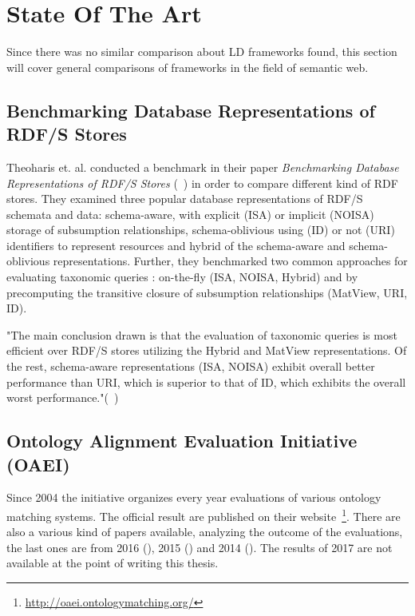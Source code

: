 \chapter{State Of The Art}

Since there was no similar comparison about LD frameworks found, this section will cover general comparisons of frameworks in the field of semantic web.

\section{Benchmarking Database Representations of RDF/S Stores}

Theoharis et. al. conducted a benchmark in their paper \emph{Benchmarking Database Representations of RDF/S Stores} (~\cite{theoharis2005benchmarking}) in order to compare different kind of RDF stores. They examined three popular database representations of RDF/S schemata and data: schema-aware, with explicit (ISA) or implicit (NOISA) storage of subsumption relationships, schema-oblivious using (ID) or not (URI) identifiers to represent resources and hybrid of the schema-aware and schema-oblivious representations. Further, they benchmarked two common approaches for evaluating taxonomic queries : on-the-fly (ISA, NOISA, Hybrid) and by precomputing the transitive closure of subsumption relationships (MatView, URI, ID). 

"The main conclusion drawn is that the evaluation of taxonomic queries is most efficient over RDF/S stores utilizing the Hybrid and MatView representations. Of the rest, schema-aware representations (ISA, NOISA) exhibit overall better performance than URI, which is superior to that of ID, which exhibits the overall worst performance."(~\cite{theoharis2005benchmarking})

\section{Ontology Alignment Evaluation Initiative (OAEI)}

Since 2004 the initiative organizes every year evaluations of various ontology matching systems. The official result are published on their website~\footnote{\url{http://oaei.ontologymatching.org/}}. There are also a various kind of papers available, analyzing the outcome of the evaluations, the last ones are from 2016 (\cite{achichi2016results}), 2015 (\cite{cheatham2015results}) and 2014 (\cite{dragisic2014results}). The results of 2017 are not available at the point of writing this thesis.

